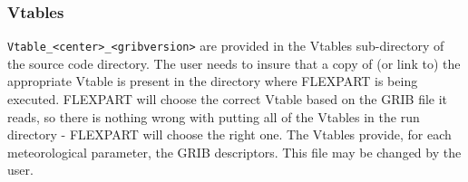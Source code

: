 \documentclass{egu}                  %
\begin{document}
\newpage

\subsubsection{Vtables}\label{appendix:vtables}
\verb|Vtable_<center>_<gribversion>| are provided in the Vtables sub-directory of the source code directory. The user needs to insure that a copy of (or link to) the appropriate Vtable is present in the directory where FLEXPART is being executed. FLEXPART will choose the correct Vtable based on the GRIB file it reads, so there is nothing wrong with putting all of the Vtables in the run directory - FLEXPART will choose the right one.  The Vtables provide, for each meteorological parameter, the GRIB descriptors. This file may be changed by the user.\par
 
\end{document}

